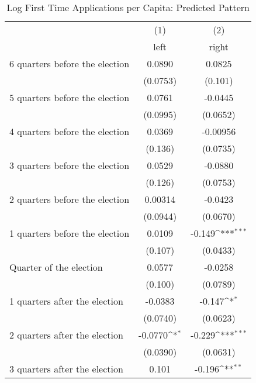 \begin{table}[htbp]\centering
\def\sym#1{\ifmmode^{#1}\else\(^{#1}\)\fi}
\caption{Log First Time Applications per Capita: Predicted Pattern}
\begin{tabular}{l*{2}{c}}
\hline\hline
                    &\multicolumn{1}{c}{(1)}&\multicolumn{1}{c}{(2)}\\
                    &\multicolumn{1}{c}{left}&\multicolumn{1}{c}{right}\\
\hline
 6 quarters before the election&      0.0890         &      0.0825         \\
                    &    (0.0753)         &     (0.101)         \\
[1em]
 5 quarters before the election&      0.0761         &     -0.0445         \\
                    &    (0.0995)         &    (0.0652)         \\
[1em]
 4 quarters before the election&      0.0369         &    -0.00956         \\
                    &     (0.136)         &    (0.0735)         \\
[1em]
 3 quarters before the election&      0.0529         &     -0.0880         \\
                    &     (0.126)         &    (0.0753)         \\
[1em]
 2 quarters before the election&     0.00314         &     -0.0423         \\
                    &    (0.0944)         &    (0.0670)         \\
[1em]
 1 quarters before the election&      0.0109         &      -0.149\sym{***}\\
                    &     (0.107)         &    (0.0433)         \\
[1em]
Quarter of the election&      0.0577         &     -0.0258         \\
                    &     (0.100)         &    (0.0789)         \\
[1em]
 1 quarters after the election&     -0.0383         &      -0.147\sym{*}  \\
                    &    (0.0740)         &    (0.0623)         \\
[1em]
 2 quarters after the election&     -0.0770\sym{*}  &      -0.229\sym{***}\\
                    &    (0.0390)         &    (0.0631)         \\
[1em]
 3 quarters after the election&       0.101         &      -0.196\sym{**} \\

\end{tabular}
\end{table}

